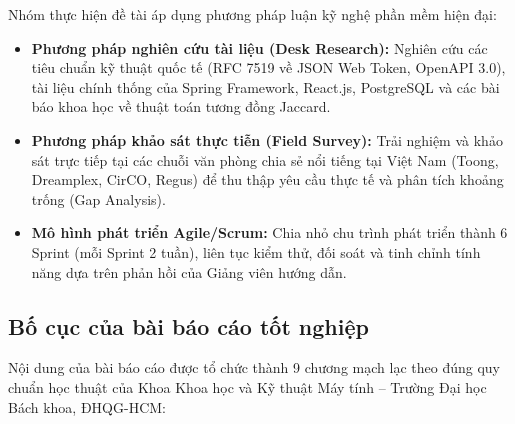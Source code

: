 Nhóm thực hiện đề tài áp dụng phương pháp luận kỹ nghệ phần mềm hiện đại:
\begin{itemize}
    \item \textbf{Phương pháp nghiên cứu tài liệu (Desk Research):} Nghiên cứu các tiêu chuẩn kỹ thuật quốc tế (RFC 7519 về JSON Web Token, OpenAPI 3.0), tài liệu chính thống của Spring Framework, React.js, PostgreSQL và các bài báo khoa học về thuật toán tương đồng Jaccard.
    \item \textbf{Phương pháp khảo sát thực tiễn (Field Survey):} Trải nghiệm và khảo sát trực tiếp tại các chuỗi văn phòng chia sẻ nổi tiếng tại Việt Nam (Toong, Dreamplex, CirCO, Regus) để thu thập yêu cầu thực tế và phân tích khoảng trống (Gap Analysis).
    \item \textbf{Mô hình phát triển Agile/Scrum:} Chia nhỏ chu trình phát triển thành 6 Sprint (mỗi Sprint 2 tuần), liên tục kiểm thử, đối soát và tinh chỉnh tính năng dựa trên phản hồi của Giảng viên hướng dẫn.
\end{itemize}

\subsection{Bố cục của bài báo cáo tốt nghiệp}

Nội dung của bài báo cáo được tổ chức thành 9 chương mạch lạc theo đúng quy chuẩn học thuật của Khoa Khoa học và Kỹ thuật Máy tính -- Trường Đại học Bách khoa, ĐHQG-HCM:

